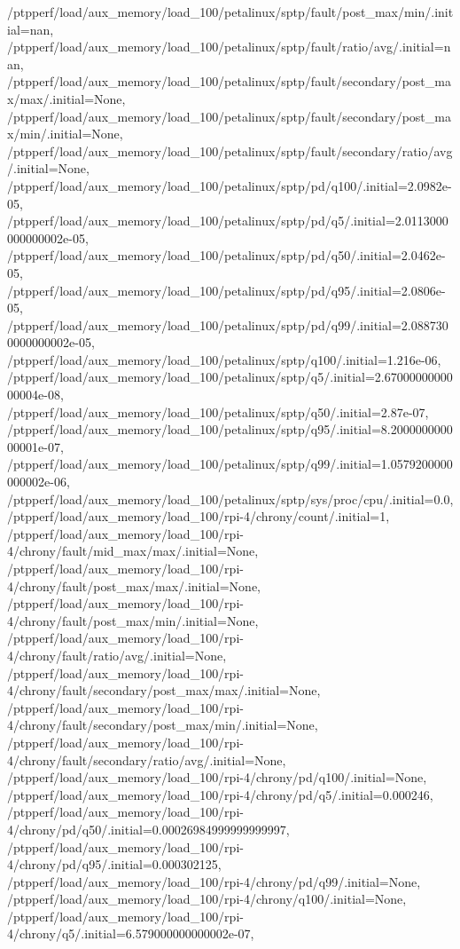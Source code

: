 {    /ptpperf/load/aux_memory/load_100/petalinux/sptp/fault/post_max/min/.initial=nan,
    /ptpperf/load/aux_memory/load_100/petalinux/sptp/fault/ratio/avg/.initial=nan,
    /ptpperf/load/aux_memory/load_100/petalinux/sptp/fault/secondary/post_max/max/.initial=None,
    /ptpperf/load/aux_memory/load_100/petalinux/sptp/fault/secondary/post_max/min/.initial=None,
    /ptpperf/load/aux_memory/load_100/petalinux/sptp/fault/secondary/ratio/avg/.initial=None,
    /ptpperf/load/aux_memory/load_100/petalinux/sptp/pd/q100/.initial=2.0982e-05,
    /ptpperf/load/aux_memory/load_100/petalinux/sptp/pd/q5/.initial=2.0113000000000002e-05,
    /ptpperf/load/aux_memory/load_100/petalinux/sptp/pd/q50/.initial=2.0462e-05,
    /ptpperf/load/aux_memory/load_100/petalinux/sptp/pd/q95/.initial=2.0806e-05,
    /ptpperf/load/aux_memory/load_100/petalinux/sptp/pd/q99/.initial=2.0887300000000002e-05,
    /ptpperf/load/aux_memory/load_100/petalinux/sptp/q100/.initial=1.216e-06,
    /ptpperf/load/aux_memory/load_100/petalinux/sptp/q5/.initial=2.6700000000000004e-08,
    /ptpperf/load/aux_memory/load_100/petalinux/sptp/q50/.initial=2.87e-07,
    /ptpperf/load/aux_memory/load_100/petalinux/sptp/q95/.initial=8.200000000000001e-07,
    /ptpperf/load/aux_memory/load_100/petalinux/sptp/q99/.initial=1.0579200000000002e-06,
    /ptpperf/load/aux_memory/load_100/petalinux/sptp/sys/proc/cpu/.initial=0.0,
    /ptpperf/load/aux_memory/load_100/rpi-4/chrony/count/.initial=1,
    /ptpperf/load/aux_memory/load_100/rpi-4/chrony/fault/mid_max/max/.initial=None,
    /ptpperf/load/aux_memory/load_100/rpi-4/chrony/fault/post_max/max/.initial=None,
    /ptpperf/load/aux_memory/load_100/rpi-4/chrony/fault/post_max/min/.initial=None,
    /ptpperf/load/aux_memory/load_100/rpi-4/chrony/fault/ratio/avg/.initial=None,
    /ptpperf/load/aux_memory/load_100/rpi-4/chrony/fault/secondary/post_max/max/.initial=None,
    /ptpperf/load/aux_memory/load_100/rpi-4/chrony/fault/secondary/post_max/min/.initial=None,
    /ptpperf/load/aux_memory/load_100/rpi-4/chrony/fault/secondary/ratio/avg/.initial=None,
    /ptpperf/load/aux_memory/load_100/rpi-4/chrony/pd/q100/.initial=None,
    /ptpperf/load/aux_memory/load_100/rpi-4/chrony/pd/q5/.initial=0.000246,
    /ptpperf/load/aux_memory/load_100/rpi-4/chrony/pd/q50/.initial=0.00026984999999999997,
    /ptpperf/load/aux_memory/load_100/rpi-4/chrony/pd/q95/.initial=0.000302125,
    /ptpperf/load/aux_memory/load_100/rpi-4/chrony/pd/q99/.initial=None,
    /ptpperf/load/aux_memory/load_100/rpi-4/chrony/q100/.initial=None,
    /ptpperf/load/aux_memory/load_100/rpi-4/chrony/q5/.initial=6.579000000000002e-07,
}
